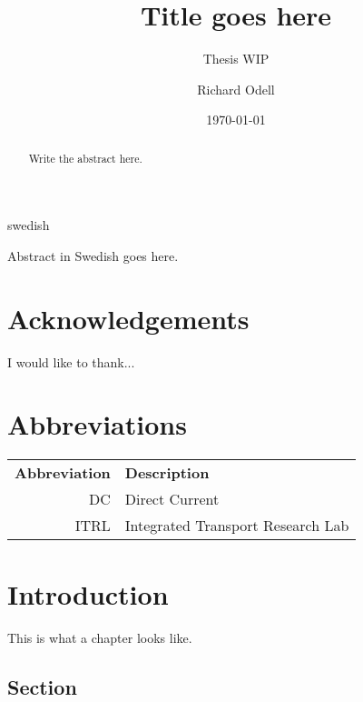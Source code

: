 \documentclass[a4paper,11pt]{kth-mag}
\title{Title goes here}
\subtitle{Thesis WIP}
\author{Richard Odell}
\date{\today}
\begin{document}
\frontmatter
\pagestyle{empty}
\removepagenumbers
\maketitle
{}


\clearpage
\begin{abstract}

Write the abstract here.

\end{abstract}
\clearpage
\begin{foreignabstract}{swedish}

Abstract in Swedish goes here.

\end{foreignabstract}
\clearpage

\chapter*{Acknowledgements}

I would like to thank...

\chapter*{Abbreviations}
\noindent{}\begin{tabular}{r  l}
\textbf{Abbreviation} 	& \textbf{Description} \vspace{.5em} \\
DC			&Direct Current\\
ITRL    &Integrated Transport Research Lab\\


\end{tabular}

\clearpage

\clearpage
\tableofcontents*
\clearpage
\listoffigures*
\clearpage
\listoftables*
\printglossaries
\mainmatter
\pagestyle{newchap}


\chapter{Introduction}
This is what a chapter looks like.

\section{Section}
\end{document}
